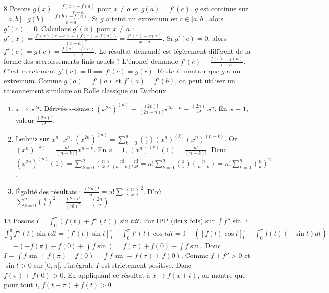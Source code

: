 \begin{correction}{8}
Posons $g(x) = \frac{f(x)-f(a)}{x-a}$ pour $x \ne a$ et $g(a)=f'(a)$.
$g$ est continue sur $[a,b]$.
$g(b) = \frac{f(b)-f(a)}{b-a}$.
Si $g$ atteint un extremum en $c \in ]a,b[$, alors $g'(c)=0$.
Calculons $g'(x)$ pour $x \ne a$ : $g'(x) = \frac{f'(x)(x-a) - (f(x)-f(a))}{(x-a)^2} = \frac{f'(x)-g(x)}{x-a}$.
Si $g'(c)=0$, alors $f'(c) = g(c) = \frac{f(c)-f(a)}{c-a}$.
Le résultat demandé est légèrement différent de la forme des accroissements finis usuels ?
L'énoncé demande $f'(c) = \frac{f(c)-f(a)}{c-a}$. C'est exactement $g'(c)=0 \implies f'(c)=g(c)$.
Reste à montrer que $g$ a un extremum.
Comme $g(a)=f'(a)$ et $f'(a)=f'(b)$, on peut utiliser un raisonnement similaire au Rolle classique ou Darboux.
\end{correction}

\begin{enumerate}
    \item $x \mapsto x^{2n}$. Dérivée $n$-ième : $(x^{2n})^{(n)} = \frac{(2n)!}{(2n-n)!} x^{2n-n} = \frac{(2n)!}{n!} x^n$.
    En $x=1$, valeur $\frac{(2n)!}{n!}$.
    \item Leibniz sur $x^n \cdot x^n$.
    $(x^{2n})^{(n)} = \sum_{k=0}^n \binom{n}{k} (x^n)^{(k)} (x^n)^{(n-k)}$.
    Or $(x^n)^{(k)} = \frac{n!}{(n-k)!} x^{n-k}$.
    En $x=1$, $(x^n)^{(k)}(1) = \frac{n!}{(n-k)!}$.
    Donc $(x^{2n})^{(n)}(1) = \sum_{k=0}^n \binom{n}{k} \frac{n!}{(n-k)!} \frac{n!}{k!} = n! \sum_{k=0}^n \binom{n}{k} \binom{n}{n-k} = n! \sum_{k=0}^n \binom{n}{k}^2$.
    \item Égalité des résultats : $\frac{(2n)!}{n!} = n! \sum \binom{n}{k}^2$.
    D'où $\sum_{k=0}^n \binom{n}{k}^2 = \frac{(2n)!}{(n!)^2} = \binom{2n}{n}$.
\end{enumerate}

\begin{correction}{13}
Posons $I = \int_0^\pi (f(t)+f''(t)) \sin t dt$.
Par IPP (deux fois) sur $\int f'' \sin$ :
$\int_0^\pi f''(t) \sin t dt = [f'(t)\sin t]_0^\pi - \int_0^\pi f'(t) \cos t dt = 0 - ([f(t)\cos t]_0^\pi - \int_0^\pi f(t)(-\sin t)dt)$
$= - (-f(\pi) - f(0) + \int f \sin) = f(\pi)+f(0) - \int f \sin$.
Donc $I = \int f \sin + f(\pi)+f(0) - \int f \sin = f(\pi)+f(0)$.
Comme $f+f''>0$ et $\sin t > 0$ sur $]0,\pi[$, l'intégrale $I$ est strictement positive.
Donc $f(\pi)+f(0) > 0$.
En appliquant ce résultat à $x \mapsto f(x+t)$, on montre que pour tout $t$, $f(t+\pi)+f(t) > 0$.
\end{correction}

